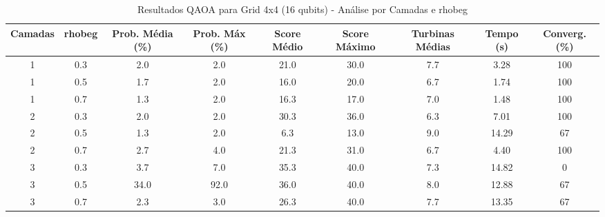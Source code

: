 \begin{table*}[htbp]
\centering
\caption{Resultados QAOA para Grid 4x4 (16 qubits) - Análise por Camadas e rhobeg}
\label{tab:resultados_4_4}
\footnotesize
\begin{tabular}{|c|c|c|c|c|c|c|c|c|}
\hline
\textbf{Camadas} & \textbf{rhobeg} & \textbf{Prob. Média (\%)} & \textbf{Prob. Máx (\%)} & \textbf{Score Médio} & \textbf{Score Máximo} & \textbf{Turbinas Médias} & \textbf{Tempo (s)} & \textbf{Converg. (\%)} \\
\hline
1 & 0.3 & 2.0 & 2.0 & 21.0 & 30.0 & 7.7 & 3.28 & 100 \\
1 & 0.5 & 1.7 & 2.0 & 16.0 & 20.0 & 6.7 & 1.74 & 100 \\
1 & 0.7 & 1.3 & 2.0 & 16.3 & 17.0 & 7.0 & 1.48 & 100 \\
2 & 0.3 & 2.0 & 2.0 & 30.3 & 36.0 & 6.3 & 7.01 & 100 \\
2 & 0.5 & 1.3 & 2.0 & 6.3 & 13.0 & 9.0 & 14.29 & 67 \\
2 & 0.7 & 2.7 & 4.0 & 21.3 & 31.0 & 6.7 & 4.40 & 100 \\
3 & 0.3 & 3.7 & 7.0 & 35.3 & 40.0 & 7.3 & 14.82 & 0 \\
3 & 0.5 & 34.0 & 92.0 & 36.0 & 40.0 & 8.0 & 12.88 & 67 \\
3 & 0.7 & 2.3 & 3.0 & 26.3 & 40.0 & 7.7 & 13.35 & 67 \\
\hline
\end{tabular}
\end{table*}